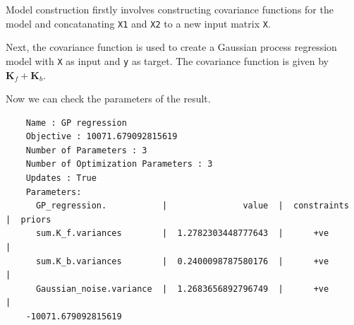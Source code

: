 Model construction firstly involves constructing covariance functions
for the model and concatanating \texttt{X1} and \texttt{X2} to a new
input matrix \texttt{X}.

\begin{Shaded}
\begin{Highlighting}[]
\OperatorTok{=}
\OperatorTok{=}\OperatorTok{=}\OperatorTok{=}
\OperatorTok{=} 
\OperatorTok{=}\OperatorTok{=}\OperatorTok{=}
\OperatorTok{=} 
\end{Highlighting}
\end{Shaded}

Next, the covariance function is used to create a Gaussian process
regression model with \texttt{X} as input and \texttt{y} as target. The
covariance function is given by \(\mathbf{K}_f + \mathbf{K}_b\).

\begin{Shaded}
\begin{Highlighting}[]
\OperatorTok{=}\OperatorTok{+}
\end{Highlighting}
\end{Shaded}

Now we can check the parameters of the result.

\begin{Shaded}
\begin{Highlighting}[]
\end{Highlighting}
\end{Shaded}

\begin{verbatim}
    Name : GP regression
    Objective : 10071.679092815619
    Number of Parameters : 3
    Number of Optimization Parameters : 3
    Updates : True
    Parameters:
      GP_regression.           |               value  |  constraints  |  priors
      sum.K_f.variances        |  1.2782303448777643  |      +ve      |        
      sum.K_b.variances        |  0.2400098787580176  |      +ve      |        
      Gaussian_noise.variance  |  1.2683656892796749  |      +ve      |        
    -10071.679092815619
\end{verbatim}

